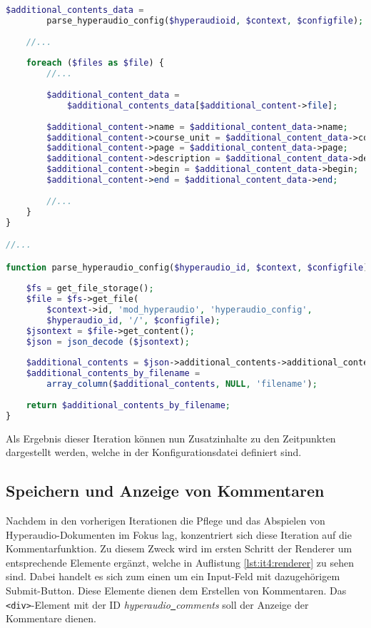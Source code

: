 \begin{lstlisting}[language=php,
             linewidth=\textwidth,
             caption={Ausschnitt der \textbf{locallib.php} in der 3. Iteration},
             label={lst:it3:locallib}]
    $additional_contents_data = 
        parse_hyperaudio_config($hyperaudioid, $context, $configfile);
    
    //...
	
    foreach ($files as $file) {        
        //...
        
        $additional_content_data =
            $additional_contents_data[$additional_content->file];
        
        $additional_content->name = $additional_content_data->name;
        $additional_content->course_unit = $additional_content_data->course_unit;
        $additional_content->page = $additional_content_data->page;
        $additional_content->description = $additional_content_data->description;
        $additional_content->begin = $additional_content_data->begin;
        $additional_content->end = $additional_content_data->end;
        
        //...
    }    
}

//...

function parse_hyperaudio_config($hyperaudio_id, $context, $configfile) {
    
    $fs = get_file_storage();
    $file = $fs->get_file(
        $context->id, 'mod_hyperaudio', 'hyperaudio_config',
        $hyperaudio_id, '/', $configfile);
    $jsontext = $file->get_content();
    $json = json_decode ($jsontext);
    
    $additional_contents = $json->additional_contents->additional_content;
    $additional_contents_by_filename =
        array_column($additional_contents, NULL, 'filename');
    
    return $additional_contents_by_filename;
}
\end{lstlisting}



Als Ergebnis dieser Iteration können nun Zusatzinhalte zu den Zeitpunkten dargestellt werden, welche in der Konfigurationsdatei definiert sind.

\subsection{Speichern und Anzeige von Kommentaren}
\label{sub:SpeichernKommentare}
Nachdem in den vorherigen Iterationen die Pflege und das Abspielen von Hyperaudio-Dokumenten im Fokus lag, konzentriert sich diese Iteration auf die Kommentarfunktion. Zu diesem Zweck wird im ersten Schritt der Renderer um entsprechende Elemente ergänzt, welche in Auflistung \ref{lst:it4:renderer} zu sehen sind. Dabei handelt es sich zum einen um ein Input-Feld mit dazugehörigem Submit-Button. Diese Elemente dienen dem Erstellen von Kommentaren. Das \texttt{<div>}-Element mit der ID \mbox{\textit{hyperaudio\underline{{ }}comments}} soll der Anzeige der Kommentare dienen.

